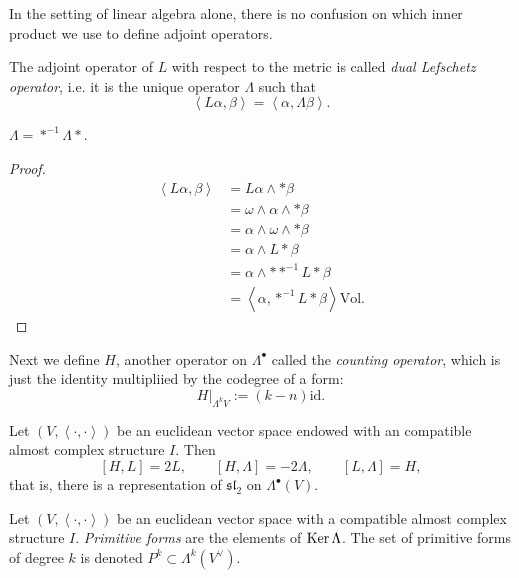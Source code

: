 \noindent
In the setting of linear algebra alone,
there is no confusion on which inner product
we use to define adjoint operators.

\begin{definition}
\label{definition-dual-lefschetz}
The adjoint operator of $L$ with respect to the metric
is called {\it dual Lefschetz operator}, i.e. it is
the unique operator $\Lambda$ such that
$$
\left<L \alpha,\beta\right>=\left<\alpha, \Lambda \beta\right>.
$$
\end{definition}

\begin{exercise}
\label{exercise-dual-lefschetz-is-hodge-twisted}
$\Lambda=*^{-1}\Lambda *$.
\end{exercise}

\begin{proof}
\begin{align*}
\left<L \alpha,\beta\right>
&=L \alpha\wedge*\beta\\
&=\omega\wedge\alpha\wedge*\beta\\
&=\alpha\wedge\omega\wedge*\beta\\
&=\alpha\wedge L * \beta\\
&=\alpha\wedge * *^{-1}L * \beta\\
&=\left<\alpha,*^{-1}L * \beta\right>\text{Vol}.
\end{align*}
\end{proof}

\noindent
Next we define $H$, another operator on $\Lambda^\bullet$
called the {\it counting operator},
which is just the identity multipliied by the codegree of a form:
$$
H|_{\Lambda^kV}:=(k-n)\text{id}.
$$
\begin{proposition}
\label{proposition-sl2-relations-exterior-algebra}
Let $(V,\left<\cdot,\cdot\right>)$ be an euclidean vector space
endowed with an compatible almost complex structure $I$.
Then
$$
[H,L]=2L,\qquad [H,\Lambda]=-2\Lambda,\qquad [L,\Lambda]=H,
$$
that is, there is a representation of $\mathfrak{sl}_2$
on $\Lambda^\bullet(V)$.
\end{proposition}

\begin{definition}
\label{definition-primitive-form}
Let $(V,\left<\cdot,\cdot\right>)$ be an euclidean
vector space with a compatible almost complex structure $I$.
{\it Primitive forms} are the elements of $\mathop{\mathrm{Ker}} \Lambda$.
The set of primitive forms of degree $k$
is denoted $P^k \subset \Lambda^k(V^\vee)$.
\end{definition}

